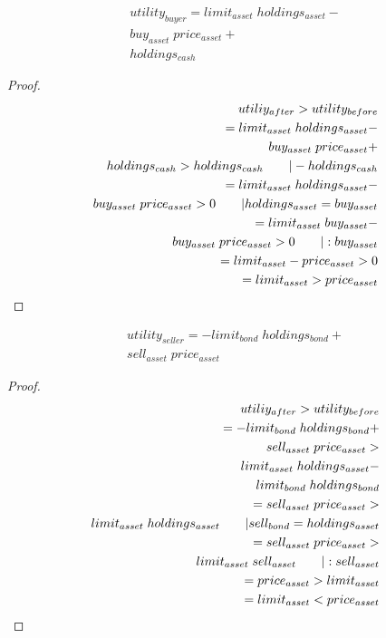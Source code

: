 \documentclass[Bachelorarbeit.tex]{subfiles}
\begin{document}
\begin{align*}
	utility_{buyer} = limit_{asset} \; holdings_{asset} - \\
				buy_{asset} \; price_{asset} + \\
				holdings_{cash}
\end{align*}

\begin{proof}
\begin{align*}
	utiliy_{after} > utility_{before} 
		\\ = limit_{asset} \; holdings_{asset} - \\
			buy_{asset} \; price_{asset} + \\
			holdings_{cash} > holdings_{cash}		\tag*{$| -holdings_{cash}$}
		\\ = limit_{asset} \; holdings_{asset} - \\
			buy_{asset} \; price_{asset} > 0		\tag*{$| holdings_{asset} = buy_{asset}$}
		\\ = limit_{asset} \; buy_{asset} - \\
			buy_{asset} \; price_{asset} > 0		\tag*{$|:buy_{asset}$}
		\\ = limit_{asset} - price_{asset} > 0
		\\ = limit_{asset} > price_{asset}			
\end{align*}
\end{proof}

\begin{align*}
	utility_{seller} = -limit_{bond} \; holdings_{bond} + \\
				sell_{asset} \; price_{asset}
\end{align*}

\begin{proof}
\begin{align*}
	utiliy_{after} > utility_{before} 
		\\ = -limit_{bond} \; holdings_{bond} + \\
				sell_{asset} \; price_{asset} > \\
				limit_{asset} \; holdings_{asset} - \\
				limit_{bond} \; holdings_{bond} 		
		\\ = sell_{asset} \; price_{asset} > \\
				limit_{asset} \; holdings_{asset}		\tag*{$| sell_{bond} = holdings_{asset}$}
		\\ = sell_{asset} \; price_{asset} > \\
				limit_{asset} \; sell_{asset}			\tag*{$|:sell_{asset}$}
		\\ =  price_{asset} > limit_{asset}		
		\\ =  limit_{asset}	< price_{asset}	
\end{align*}
\end{proof}
	
\end{document}
